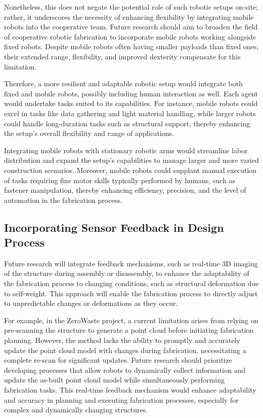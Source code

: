         Nonetheless, this does not negate the potential role of such robotic setups on-site; rather, it underscores the necessity of enhancing flexibility by integrating mobile robots into the cooperative team. Future research should aim to broaden the field of cooperative robotic fabrication to incorporate mobile robots working alongside fixed robots. Despite mobile robots often having smaller payloads than fixed ones, their extended range, flexibility, and improved dexterity compensate for this limitation.

        Therefore, a more resilient and adaptable robotic setup would integrate both fixed and mobile robots, possibly including human interaction as well. Each agent would undertake tasks suited to its capabilities. For instance, mobile robots could excel in tasks like data gathering and light material handling, while larger robots could handle long-duration tasks such as structural support, thereby enhancing the setup's overall flexibility and range of applications.

        Integrating mobile robots with stationary robotic arms would streamline labor distribution and expand the setup's capabilities to manage larger and more varied construction scenarios. Moreover, mobile robots could supplant manual execution of tasks requiring fine motor skills typically performed by humans, such as fastener manipulation, thereby enhancing efficiency, precision, and the level of automation in the fabrication process.

    \subsection{Incorporating Sensor Feedback in Design Process}
        Future research will integrate feedback mechanisms, such as real-time 3D imaging of the structure during assembly or disassembly, to enhance the adaptability of the fabrication process to changing conditions, such as structural deformation due to self-weight. This approach will enable the fabrication process to directly adjust to unpredictable changes or deformations as they occur.

        For example, in the ZeroWaste project, a current limitation arises from relying on pre-scanning the structure to generate a point cloud before initiating fabrication planning. However, the method lacks the ability to promptly and accurately update the point cloud model with changes during fabrication, necessitating a complete re-scan for significant updates. Future research should prioritize developing processes that allow robots to dynamically collect information and update the as-built point cloud model while simultaneously performing fabrication tasks. This real-time feedback mechanism would enhance adaptability and accuracy in planning and executing fabrication processes, especially for complex and dynamically changing structures.

